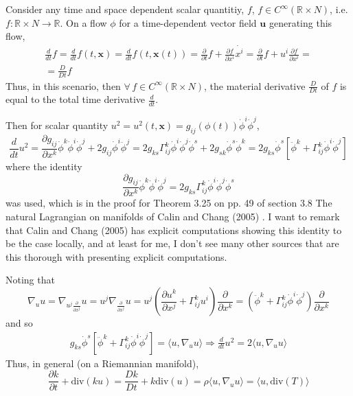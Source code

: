\documentclass[10pt]{amsart}
\begin{document}
\begin{multicols*}{2}
\begin{enumerate}
Consider any time and space dependent scalar quantitiy, $f$, $f \in C^{\infty}(\mathbb{R}\times N)$, i.e. $f:\mathbb{R}\times N \to \mathbb{R}$.  On a flow $\phi$ for a time-dependent vector field $\mathbf{u}$ generating this flow,
\[
\begin{gathered}
  \frac{d}{dt}f = \frac{d}{dt}f(t,\mathbf{x}) = \frac{d}{dt}f(t,\mathbf{x}(t)) = \frac{ \partial }{ \partial t}f + \frac{ \partial f}{ \partial x^i} \dot{x^i} = \frac{ \partial }{ \partial t} f + u^i \frac{ \partial f}{ \partial x^i} =  \\
  = \frac{D}{Dt}f
\end{gathered}
\]
Thus, in this scenario, then $\forall \, f \in C^{\infty}(\mathbb{R}\times N)$, the material derivative $\frac{D}{Dt}$ of $f$ is equal to the total time derivative $\frac{d}{dt}$.  

Then for scalar quantity $u^2 = u^2(t,\mathbf{x}) = g_{ij}(\phi(t)) \dot{\phi}^i \dot{\phi}^j$, 
\[
\frac{d}{dt} u^2 = \frac{ \partial g_{ij}}{ \partial x^k } \dot{\phi}^k \dot{\phi}^i \dot{\phi}^j + 2 g_{ij} \dot{\phi}^i \ddot{\phi}^j = 2 g_{ks} \Gamma_{ij}^k \dot{\phi}^i \dot{\phi}^j \dot{\phi}^s + 2 g_{sk} \dot{\phi}^s \dot{\phi}^k = 2g_{ks} \dot{\phi}^s \left[ \ddot{\phi}^k + \Gamma^k_{ij} \dot{\phi}^i \dot{\phi}^j \right]
\]
where the identity
\[
\frac{ \partial g_{ij} }{ \partial x^k} \dot{\phi}^k \dot{\phi}^i \dot{\phi}^j = 2 g_{ks} \Gamma^k_{ij} \dot{\phi}^i \dot{\phi}^j \dot{\phi}^s
\]
was used, which is in the proof for Theorem 3.25 on pp. 49 of section 3.8 The natural Lagrangian on manifolds of Calin and Chang (2005) \cite{OCalinDChang2005}.  I want to remark that Calin and Chang (2005) \cite{OCalinDChang2005} has explicit computations showing this identity to be the case locally, and at least for me, I don't see many other sources that are this thorough with presenting explicit computations.  

Noting that 
\[
\nabla_u u = \nabla_{u^j \frac{ \partial }{ \partial x^j} } u = u^j \nabla_{\frac{\partial }{ \partial x^j} } u = u^j \left( \frac{ \partial u^k}{ \partial x^j} + \Gamma^k_{ij} u^i \right) \frac{ \partial }{ \partial x^k} = \left( \ddot{\phi}^k + \Gamma^k_{ij} \dot{\phi}^i \dot{\phi}^j \right) \frac{ \partial }{ \partial x^k}
\]
and so
\[
\begin{gathered}
g_{ks}\dot{\phi}^s \left[ \ddot{\phi}^k + \Gamma^k_{ij} \dot{\phi}^i \dot{\phi}^j \right] = \langle u , \nabla_uu\rangle \Longrightarrow \frac{d}{dt}u^2 = 2 \langle u , \nabla_u u \rangle
\end{gathered}
\]
Thus, in general (on a Riemannian manifold), 
\begin{equation}\label{Eq:KEdensityflow}
\boxed{ \frac{\partial k}{\partial t} + \text{div}(ku) = \frac{Dk}{Dt} + k\text{div}(u) = \rho \langle u, \nabla_u u \rangle = \langle u, \text{div}(T) \rangle }
\end{equation}


\end{enumerate}
\end{multicols*}
\end{document}
